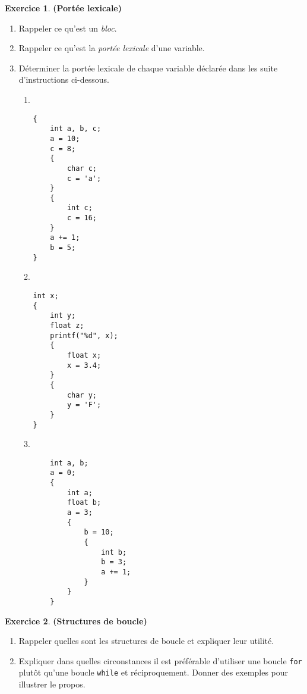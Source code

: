 \documentclass[12pt]{article}
\theoremstyle{definition}
\newtheorem{Exercice}{Exercice}
\begin{document}
\begin{Exercice} {\bf (Portée lexicale)}\smallskip
\begin{enumerate}
    \item Rappeler ce qu'est un {\em bloc}.
    \smallskip

    \item Rappeler ce qu'est la {\em portée lexicale} d'une variable.
    \smallskip
    
    \item Déterminer la portée lexicale de chaque variable déclarée dans 
    les suite d'instructions ci-dessous.
\begin{multicols}{3}
\begin{enumerate}
\item~
\begin{lstlisting}
{
    int a, b, c;
    a = 10;
    c = 8;
    {
        char c;
        c = 'a';
    }
    {
        int c;
        c = 16;
    }
    a += 1;
    b = 5;
}
\end{lstlisting}

\item~
\begin{lstlisting}
int x;
{
    int y;
    float z;
    printf("%d", x);
    {
        float x;
        x = 3.4;
    }
    {
        char y;
        y = 'F';
    }
}
\end{lstlisting}
\bigskip

\item~
\begin{lstlisting}
    int a, b;
    a = 0;
    {
        int a;
        float b;
        a = 3;
        {
            b = 10;
            {
                int b;
                b = 3;
                a += 1;
            }
        }
    }
\end{lstlisting}
\end{enumerate}
\end{multicols}
\end{enumerate}
\end{Exercice}
\bigskip

\begin{Exercice} {\bf (Structures de boucle)}\smallskip
\begin{enumerate}
    \item Rappeler quelles sont les structures de boucle et
    expliquer leur utilité.
    \smallskip

    \item Expliquer dans quelles circonstances il est préférable
    d'utiliser une boucle {\tt for} plutôt qu'une boucle {\tt while}
    et réciproquement. Donner des exemples pour illustrer le propos.
\end{enumerate}
\end{Exercice}
\bigskip
\end{document}
